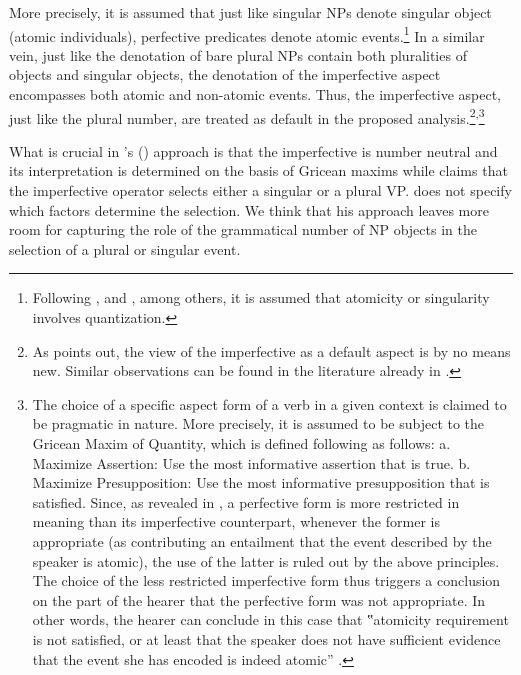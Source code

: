 \documentclass[output=paper]{langscibook}
\begin{document}
\noindent More precisely, it is assumed that just like singular NPs denote singular object (atomic individuals), perfective predicates denote atomic events.\footnote{Following \citet{Krifka1992}, \citet{Filip2000} and \citet{Rothstein2004}, among others, it is assumed that atomicity or singularity involves quantization.} In a similar vein, just like the denotation of bare plural NPs contain both pluralities of objects and singular objects, the denotation of the imperfective aspect encompasses both atomic and non-atomic events. Thus, the imperfective aspect, just like the plural number, are treated as default in the proposed analysis.\footnote{As \citet{Kagan2010} points out, the view of the imperfective as a default aspect is by no means new. Similar observations can be found in the literature already in  \citet{Forsyth1970}.}\textsuperscript{,}\footnote{The choice of a specific aspect form of a verb in a given context is claimed to be pragmatic in nature. More precisely, it is assumed to be subject to the Gricean Maxim of Quantity, which \citet{Kagan2008, Kagan2010} is defined following \citet{Sauerland2003b} as follows:	a.	Maximize Assertion: Use the most informative assertion that is true. b.	Maximize Presupposition: Use the most informative presupposition that is satisfied.   
Since, as revealed in , a perfective form is more restricted in meaning than its imperfective counterpart, whenever the former is appropriate (as contributing an entailment that the event described by the speaker is atomic), the use of the latter is ruled out by the above principles. The choice of the less restricted imperfective form thus triggers a conclusion on the part of the hearer that the perfective form was not appropriate. In other words, the hearer can conclude in this case that ‟atomicity requirement is not satisfied, or at least that the speaker does not have sufficient evidence that the event she has encoded is indeed atomic” \citep[pp. 10-12]{Kagan2008}.}
 
What is crucial in \citeauthor{Kagan2008}'s (\citeyear{Kagan2008, Kagan2010}) approach is that the imperfective is number neutral and its interpretation is determined on the basis of Gricean maxims while \citet{Ferreira2004, Ferreira2005} claims that the imperfective operator selects either a singular or a plural VP. \citet{Ferreira2004, Ferreira2005} does not specify which factors determine the selection. We think that his approach leaves more room for capturing the role of the grammatical number of NP objects in the selection of a plural or singular event.  
\end{document}
